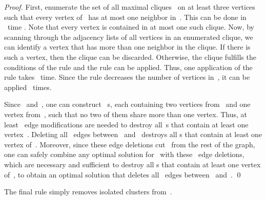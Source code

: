 \documentclass[envcountsame,numbook,smallextended]{svjour3}
\numberwithin{equation}{section}
\numberwithin{figure}{section}
\begin{document}
\begin{proof}
  First, enumerate the set of all maximal cliques~
  on at least three vertices
  such that every vertex of~
  has at most one neighbor in~.
  This can be done in ~time \cite{KHMN09}.
  Note that every vertex is contained
  in at most one such clique.
  Now, by scanning
  through the adjacency lists of all vertices
  in an enumerated clique,
  we can identify a vertex that has
  more than one neighbor in the clique. If there is such a vertex, then the clique can be discarded.
  Otherwise, the clique fulfills the conditions
  of the rule and the rule can be applied.
  Thus, one application of the rule takes~ time.
  Since the rule decreases the number of vertices in~,
  it can be applied~ times.

  Since~ and~,
  one can construct ~s,
  each containing two vertices from~
  and one vertex from~,
  such that no two of them share more than one vertex.
  Thus, at least ~edge modifications are needed
  to destroy all~s
  that contain at least one vertex~.
  Deleting all ~edges between~ and~
  destroys all s that
  contain at least one vertex of~.
  Moreover, since these edge deletions cut~
  from the rest of the graph,
  one can safely combine
  any optimal solution for~
  with these~ edge deletions,
  which are necessary and sufficient
  to destroy all s that contain
  at least one vertex of~,
  to obtain an optimal solution
  that deletes all ~edges between~ and~.
\qed\end{proof}
The final rule simply removes isolated clusters from~. 
\end{document}
